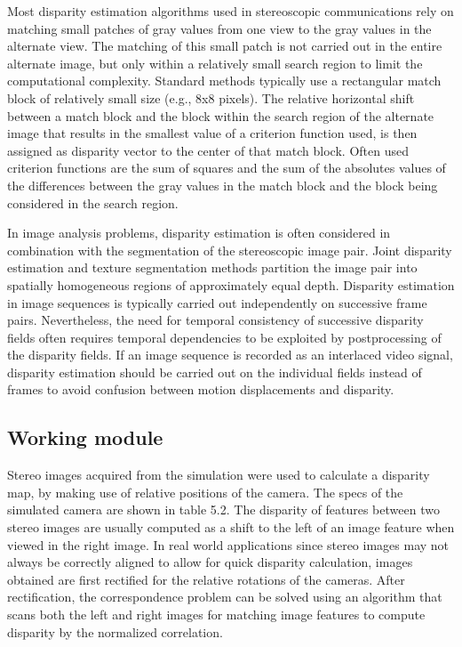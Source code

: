 		Most  disparity  estimation  algorithms  used  in  stereoscopic  communications  rely  on  matching small  patches  of  gray  values  from  one  view  to  the  gray  values  in  the  alternate  view.  The matching  of  this  small  patch  is  not  carried  out  in  the  entire  alternate  image,  but  only  within  a relatively  small  search  region  to  limit  the  computational  complexity.  Standard  methods typically  use  a  rectangular  match  block  of  relatively  small  size  (e.g.,  8x8  pixels). The relative horizontal shift between a match block and the block within the search region  of  the  alternate  image  that  results  in  the  smallest  value  of  a  criterion  function  used,  is then  assigned  as  disparity  vector  to  the  center  of  that  match  block.  Often  used  criterion 
		functions are the sum of squares and the sum of the absolutes values of the differences between the  gray  values  in  the  match  block  and  the  block  being  considered  in  the  search  region.
		
		In  image  analysis  problems,  disparity  estimation  is  often  considered  in  combination  with  the segmentation   of   the   stereoscopic   image   pair.   Joint   disparity   estimation   and   texture segmentation   methods   partition   the   image   pair   into   spatially   homogeneous   regions   of approximately  equal  depth.  Disparity  estimation  in  image  sequences  is  typically  carried  out independently  on  successive  frame  pairs.  Nevertheless,  the  need  for  temporal  consistency  of successive   disparity   fields   often   requires   temporal   dependencies   to   be   exploited   by postprocessing  of  the  disparity  fields.  If  an  image  sequence  is  recorded  as  an  interlaced  video  
		signal,  disparity  estimation  should  be  carried  out  on  the  individual  fields instead  of  frames  to avoid confusion between motion displacements and disparity.
	
	
	\subsection{Working module}
	
	Stereo images acquired from the simulation were used to calculate a disparity map, by making use of relative positions of the camera. The specs of the simulated camera are shown in table 5.2. The disparity of features between two stereo images are usually computed as a shift to the left of an image feature when viewed in the right image. In real world applications since stereo images may not always be correctly aligned to
	allow for quick disparity calculation, images obtained are first rectified for the relative rotations of the cameras. After rectification, the correspondence problem can be solved using an algorithm that scans both the left and right images for matching image features to compute disparity by the normalized correlation.
	
